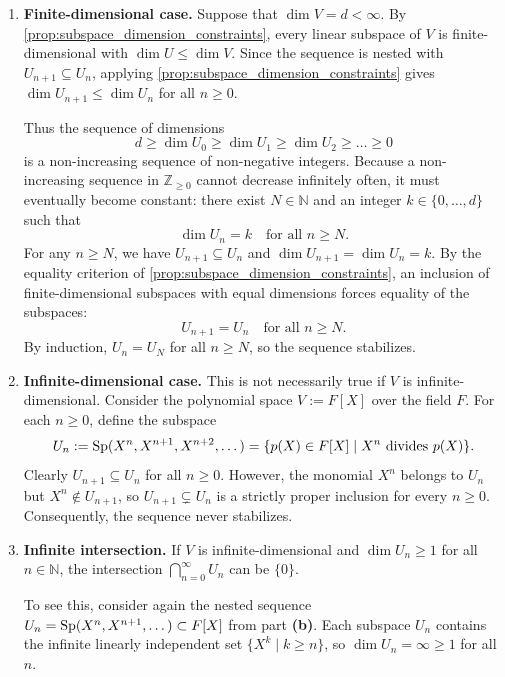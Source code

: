 \begin{exercisesolution}
\label{sol:descending_chains_subspaces}
\begin{enumerate}[label=\textbf{(\alph*)}]
    \item \textbf{Finite-dimensional case.} Suppose that $\dim V = d < \infty$. By \cref{prop:subspace_dimension_constraints}, every linear subspace of $V$ is finite-dimensional with $\dim U \le \dim V$. Since the sequence is nested with $U_{n+1} \subseteq U_n$, applying \cref{prop:subspace_dimension_constraints} gives $\dim U_{n+1} \le \dim U_n$ for all $n \ge 0$.
    
    Thus the sequence of dimensions
    \[
        d \ge \dim U_0 \ge \dim U_1 \ge \dim U_2 \ge \dots \ge 0
    \]
    is a non-increasing sequence of non-negative integers. Because a non-increasing sequence in $\mathbb{Z}_{\ge 0}$ cannot decrease infinitely often, it must eventually become constant: there exist $N \in \mathbb{N}$ and an integer $k \in \{0, \dots, d\}$ such that
    \[
        \dim U_n = k \quad \text{for all } n \ge N.
    \]
    For any $n \ge N$, we have $U_{n+1} \subseteq U_n$ and $\dim U_{n+1} = \dim U_n = k$. By the equality criterion of \cref{prop:subspace_dimension_constraints}, an inclusion of finite-dimensional subspaces with equal dimensions forces equality of the subspaces:
    \[
        U_{n+1} = U_n \quad \text{for all } n \ge N.
    \]
    By induction, $U_n = U_N$ for all $n \ge N$, so the sequence stabilizes.

    \item \textbf{Infinite-dimensional case.} This is not necessarily true if $V$ is infinite-dimensional. Consider the polynomial space $V := F[X]$ over the field $F$. For each $n \ge 0$, define the subspace
    \[
        U_n := \operatorname{Sp}(X^n, X^{n+1}, X^{n+2}, \dots) = \{p(X) \in F[X] \mid X^n \text{ divides } p(X)\}.
    \]
    Clearly $U_{n+1} \subseteq U_n$ for all $n \ge 0$. However, the monomial $X^n$ belongs to $U_n$ but $X^n \notin U_{n+1}$, so $U_{n+1} \subsetneq U_n$ is a strictly proper inclusion for every $n \ge 0$. Consequently, the sequence never stabilizes.

    \item \textbf{Infinite intersection.} If $V$ is infinite-dimensional and $\dim U_n \ge 1$ for all $n \in \mathbb{N}$, the intersection $\bigcap_{n=0}^\infty U_n$ can be $\{0\}$.
    
    To see this, consider again the nested sequence $U_n = \operatorname{Sp}(X^n, X^{n+1}, \dots) \subset F[X]$ from part \textbf{(b)}. Each subspace $U_n$ contains the infinite linearly independent set $\{X^k \mid k \ge n\}$, so $\dim U_n = \infty \ge 1$ for all $n$.
    

\end{enumerate}
\end{exercisesolution}
